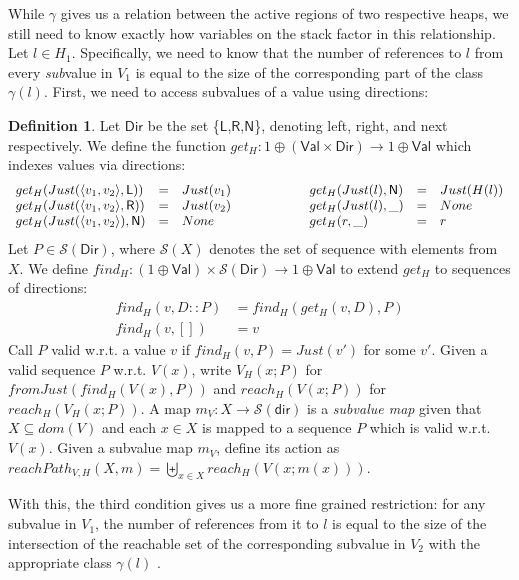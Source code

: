 \documentclass{easychair}
\newcommand{\ms}[1]{\ensuremath{\mathsf{#1}}}
\theoremstyle{definition}
\newtheorem{definition}{Definition}
\begin{document}
While $\gamma$ gives us a relation between the active regions of two respective heaps, 
we still need to know 
exactly how variables on the stack factor in this relationship. Let $l \in H_1$. 
Specifically, we need to know that the number of references to $l$ from every \emph{sub}value
in $V_1$ is equal to the size of the corresponding part of the class $\gamma(l)$.  
First, we need to access 
subvalues of a value using directions: 

\begin{definition}
	Let \ms{Dir} be the set \{\ms{L},\ms{R},\ms{N}\}, denoting left, right, and next 
  respectively. We define the function 
  $get_H : 1 \oplus (\ms{Val} \times \ms{Dir}) \to 1 \oplus \ms{Val}$
  which indexes values via directions:
        $$
	\begin{array}{lclclcl}
		get_H(Just(\pairexcst{v_1}{v_2},\ms{L})) &=& Just(v_1) & \hspace{4em} &
		get_H(Just(l),\ms{N}) &=& Just(H(l)) \\
                get_H(Just(\pairexcst{v_1}{v_2},\ms{R})) &=& Just(v_2) &&
                get_H(Just(l), \_) &=& None\\
                get_H(Just(\pairexcst{v_1}{v_2}),\ms{N}) &=& None &&
		get_H(r,\_) &=& r
	\end{array}
        $$
  Let $P \in \mathcal{S}(\ms{Dir})$, where $\mathcal{S}(X)$ denotes the set of sequence
  with elements from $X$. We define 
  $find_H : (1 \oplus \ms{Val}) \times \mathcal{S}(\ms{Dir}) \to 1 \oplus \ms{Val}$ 
  to extend $get_H$ to sequences of directions:
	\begin{align*}
		find_H(v,D::P) &= find_H(get_H(v,D),P)\\
		find_H(v,[]) &= v
	\end{align*}
	Call $P$ valid w.r.t. a value $v$ if $find_H(v,P) = Just (v')$ for some $v'$.
  Given a valid sequence $P$ w.r.t. $V(x)$,
	write $V_H(x;P)$ for $fromJust(find_H(V(x),P))$
	and $reach_H(V(x;P))$ for $reach_H(V_H(x;P))$.
        A map $m_V : X \to \mathcal{S}(\ms{dir})$ is a
        \emph{subvalue map} given that $X \subseteq dom(V)$ and each
        $x \in X$ is mapped to a sequence $P$ which is valid w.r.t. $V(x)$.  
	Given a subvalue map $m_V$,
        define its action as $reachPath_{V,H}(X,m) = \biguplus_{x \in X} reach_H(V(x;m(x)))$.
\end{definition}

With this, the third condition gives us a more fine grained restriction: for any subvalue in $V_1$,
the number of references from it to $l$ is equal to the size of 
the intersection of the reachable set of the corresponding subvalue in $V_2$
with the appropriate class $\gamma(l)$ .
\end{document}
